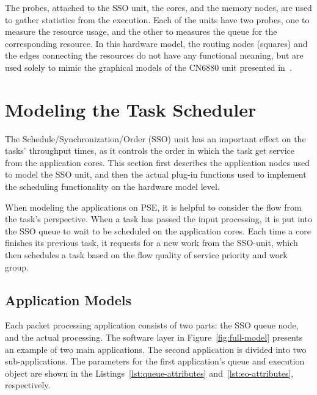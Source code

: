 The probes, attached to the SSO unit, the cores, and the memory nodes, are used to gather statistics from the execution. Each of the units have two probes, one to measure the resource usage, and the other to measures the queue for the corresponding resource. In this hardware model, the routing nodes (squares) and the edges connecting the resources do not have any functional meaning, but are used solely to mimic the graphical models of the CN6880 unit presented in~\cite{cavium:2010:fundamentals}.

\section{Modeling the Task Scheduler}
\label{sec:modeling-task-scheduler}

The Schedule/Synchronization/Order (SSO) unit has an important effect on the tasks' throughput times, as it controls the order in which the task get service from the application cores. This section first describes the application nodes used to model the SSO unit, and then the actual plug-in functions used to implement the scheduling functionality on the hardware model level.







When modeling the applications on PSE, it is helpful to consider the flow from the task's perspective. When a task has passed the input processing, it is put into the SSO queue to wait to be scheduled on the application cores. Each time a core finishes its previous task, it requests for a new work from the SSO-unit, which then schedules a task based on the flow quality of service  priority and work group.

\subsection{Application Models}
\label{application-models}

Each packet processing application consists of two parts: the SSO queue node, and the actual processing. The software layer in Figure~\ref{fig:full-model} presents an example of two main applications. The second application is divided into two sub-applications. The parameters for the first application's queue and execution object are shown in the Listings~\ref{lst:queue-attributes} and~\ref{lst:eo-attributes}, respectively.

